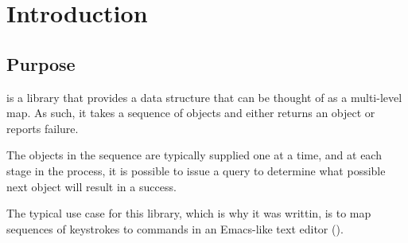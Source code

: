 \chapter{Introduction}
%

\section{Purpose}

\sysname{} is a library that provides a data structure that can be
thought of as a multi-level map.  As such, it takes a sequence of
objects and either returns an object or reports failure.

The objects in the sequence are typically supplied one at a time, and
at each stage in the process, it is possible to issue a query to
determine what possible next object will result in a success.

The typical use case for this library, which is why it was writtin, is
to map sequences of keystrokes to commands in an Emacs-like text
editor
(\cite{GNUEmacsLispReferenceManual,CraftOfTextEditiing,Finseth:1980:TPTa}).
